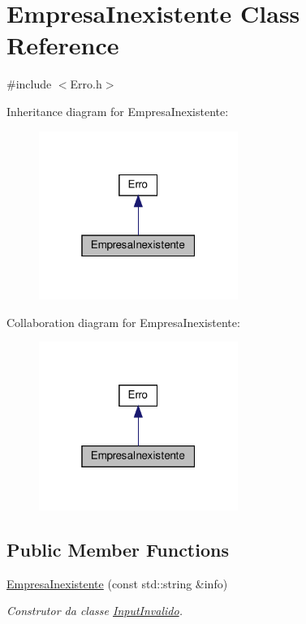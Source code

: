 \hypertarget{classEmpresaInexistente}{}\section{Empresa\+Inexistente Class Reference}
\label{classEmpresaInexistente}


{\ttfamily \#include $<$Erro.\+h$>$}



Inheritance diagram for Empresa\+Inexistente\+:
\nopagebreak
\begin{figure}[H]
\begin{center}
\leavevmode
\includegraphics[width=184pt]{classEmpresaInexistente__inherit__graph}
\end{center}
\end{figure}


Collaboration diagram for Empresa\+Inexistente\+:
\nopagebreak
\begin{figure}[H]
\begin{center}
\leavevmode
\includegraphics[width=184pt]{classEmpresaInexistente__coll__graph}
\end{center}
\end{figure}
\subsection*{Public Member Functions}
\begin{DoxyCompactItemize}
\item 
\hyperlink{classEmpresaInexistente_a96bfdab77510c1f330c6c66b7df19edd}{Empresa\+Inexistente} (const std\+::string \&info)
\begin{DoxyCompactList}\small\item\em Construtor da classe \hyperlink{classInputInvalido}{Input\+Invalido}. \end{DoxyCompactList}\end{DoxyCompactItemize}


